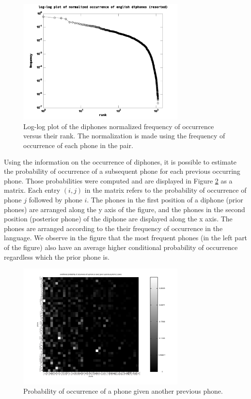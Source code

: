 \begin{figure}[h!]
\centering
\includegraphics[width=0.75\textwidth]{images/diphonesnormalizedfrequencyresorted_en.pdf}
\caption{Log-log plot of the diphones normalized frequency of occurrence versus their rank. The normalization is made using the frequency of occurrence of each phone in the pair.}
\label{fig:diphonesnormalizedfrequencyresorted_en}
\end{figure} 


Using the information on the occurrence of diphones, it is possible to estimate the probability of occurrence of a subsequent phone for each previous occurring phone. Those probabilities were computed and are displayed in Figure \ref{fig:diphones_cond_probability_en} as a matrix. Each entry $(i,j)$ in the matrix refers to the probability of occurrence of phone $j$ followed by phone $i$. The phones in the first position of a diphone (prior phones) are arranged along the y axis of the figure, and the phones in the second position (posterior phone) of the diphone are displayed along the x axis. The phones are arranged according to the their frequency of occurrence in the language. We observe in the figure that the most frequent phones (in the left part of the figure) also have an average higher conditional probability of occurrence regardless which the prior phone is.


\begin{figure}[h!]
\centering
\includegraphics[width=0.75\textwidth]{images/diphones_cond_probability_en.pdf}
\caption{Probability of occurrence of a phone given another previous phone.}
\label{fig:diphones_cond_probability_en}
\end{figure} 




